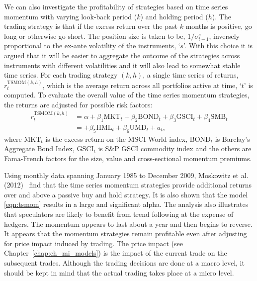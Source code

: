 We can also investigate the profitability of strategies based on time series momentum with varying look-back period ($k$) and holding period ($h$). The trading strategy is that if the excess return over the past $k$ months is positive, go long or otherwise go short. The position size is taken to be, $1/\sigma_{t-1}^s$, inversely proportional to the ex-ante volatility of the instruments, `$s$'. With this choice it is argued that it will be easier to aggregate the outcome of the strategies across instruments with different volatilities and it will also lead to somewhat stable time series. For each trading strategy $(k, h)$, a single time series of returns, $r_t^{\text{TSMOM}(k,h)}$, which is the average return across all portfolios active at time, `$t$' is computed. To evaluate the overall value of the time series momentum strategies, the returns are adjusted for possible risk factors:
	\begin{equation} \label{eqn:tsmom}
	\begin{aligned}
	r_t^{\text{TSMOM}(k,h)}&= \alpha + \beta_1 \text{MKT}_t + \beta_2 \text{BOND}_t + \beta_3 \text{GSCI}_t + \beta_4 \text{SMB}_t \\
	&=  + \beta_5 \text{HML}_t + \beta_6 \text{UMD}_t + a_t,
	\end{aligned}
	\end{equation}
where $\text{MKT}_t$ is the excess return on the MSCI World index, $\text{BOND}_t$ is Barclay's Aggregate Bond Index, $\text{GSCI}_t$ is S\&P GSCI commodity index and the others are Fama-French factors for the size, value and cross-sectional momentum premiums.\label{in:fama1}


Using monthly data spanning January 1985 to December 2009, Moskowitz et al. (2012)~\cite{mos2012} find that the time series momentum strategies provide additional returns over and above a passive buy and hold strategy. It is also shown that the model \eqref{eqn:tsmom} results in a large and significant alpha. The analysis also illustrates that speculators are likely to benefit from trend following at the expense of hedgers. The momentum appears to last about a year and then begins to reverse. It appears that the momentum strategies remain profitable even after adjusting for price impact induced by trading. The price impact (see Chapter~\ref{chap:ch_mi_models}) is the impact of the current trade on the subsequent trades. Although the trading decisions are done at a macro level, it should be kept in mind that the actual trading takes place at a micro level.  



